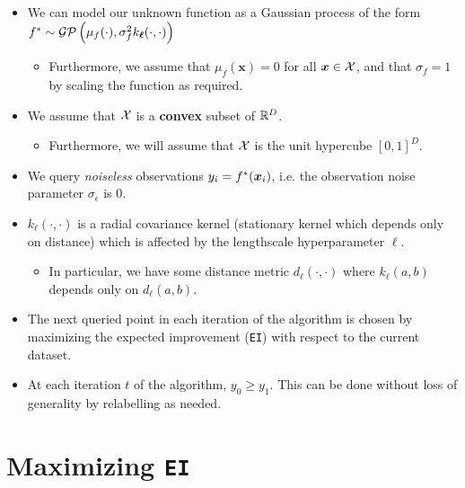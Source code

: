 \documentclass[11pt]{article}
\numberwithin{figure}{section}
\numberwithin{equation}{section}
\def\EI{\texttt{EI}}
\def\calGP{\mathcal{GP}}
\newcommand{\bs}[1]{\boldsymbol{#1}}
\def\bsx{\bs{x}}
\def\bell{\bs{\ell}}
\begin{document}
\begin{itemize}[label=]

  \item We can model our unknown function as a Gaussian process of the form $\fstar \sim \calGP\left(\mu_{f}(\cdot), \sigma_{f}^{2}k_{\bell}(\cdot, \cdot)\right)$
  \begin{itemize}[label=]
    \item Furthermore, we assume that $\mu_{f}(\bsx) = 0$ for all $\bsx \in \calX$, and that $\sigma_{f} = 1$ by scaling the function as required.
  \end{itemize}

  \item We assume that $\mathcal{X}$ is a \textbf{convex} subset of $\mathbb{R}^{D}$. 
  \begin{itemize}[label=]
    \item Furthermore, we will assume that $\mathcal{X}$ is the unit hypercube $[0, 1]^{D}$.
  \end{itemize}

  \item We query \textit{noiseless} observations $y_{i} = \fstar(\bsx_{i})$, i.e. the observation noise parameter $\sigma_{\epsilon}$ is 0. 

  \item $k_{\bell}(\cdot, \cdot)$ is a radial covariance kernel (stationary kernel which depends only on distance) which is affected by the lengthscale hyperparameter $\bell$.
  \begin{itemize}[label=]
    \item In particular, we have some distance metric $d_{\bell}(\cdot, \cdot)$ where $k_{\bell}(a, b)$ depends only on $d_{\bell}(a,b)$.
  \end{itemize}

  \item The next queried point in each iteration of the algorithm is chosen by maximizing the expected improvement (\EI{}) with respect to the current dataset. 

  \item At each iteration $t$ of the algorithm, $y_{0} \ge y_{1}$. This can be done without loss of generality by relabelling as needed.
\end{itemize}

\newpage

\section{Maximizing \EI}
\end{document}
